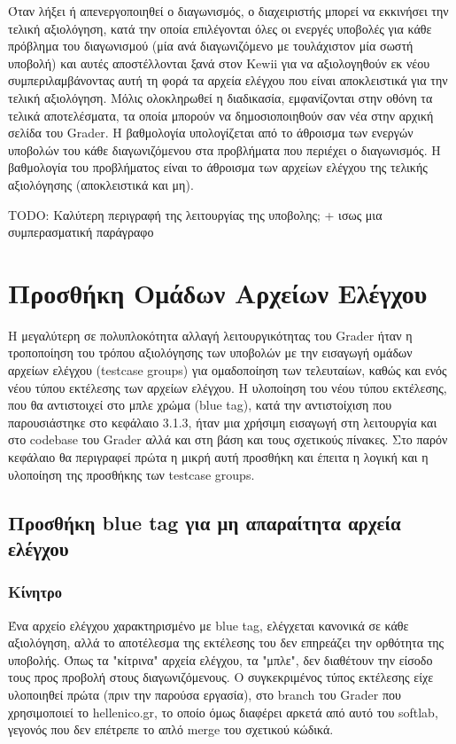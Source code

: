 \documentclass[diploma]{softlab-thesis}
\begin{document}
\bigskip

Όταν λήξει ή απενεργοποιηθεί ο διαγωνισμός, ο διαχειριστής μπορεί να εκκινήσει
την τελική αξιολόγηση, κατά την οποία επιλέγονται όλες οι ενεργές υποβολές για
κάθε πρόβλημα του διαγωνισμού (μία ανά διαγωνιζόμενο με τουλάχιστον μία σωστή
υποβολή) και αυτές αποστέλλονται ξανά στον Kewii για να αξιολογηθούν εκ νέου
συμπεριλαμβάνοντας αυτή τη φορά τα αρχεία ελέγχου που είναι αποκλειστικά για
την τελική αξιολόγηση. Μόλις ολοκληρωθεί η διαδικασία, εμφανίζονται στην οθόνη
τα τελικά αποτελέσματα, τα οποία μπορούν να δημοσιοποιηθούν σαν νέα στην αρχική
σελίδα του Grader. Η βαθμολογία υπολογίζεται από το άθροισμα των ενεργών
υποβολών του κάθε διαγωνιζόμενου στα προβλήματα που περιέχει ο διαγωνισμός. Η
βαθμολογία του προβλήματος είναι το άθροισμα των αρχείων ελέγχου της τελικής
αξιολόγησης (αποκλειστικά και μη).

TODO: Καλύτερη περιγραφή της λειτουργίας της υποβολης; + ισως μια συμπερασματική παράγραφο

\chapter{Προσθήκη Ομάδων Αρχείων Ελέγχου}

Η μεγαλύτερη σε πολυπλοκότητα αλλαγή λειτουργικότητας του Grader ήταν η
τροποποίηση του τρόπου αξιολόγησης των υποβολών με την εισαγωγή ομάδων αρχείων
ελέγχου (testcase groups) για ομαδοποίηση των τελευταίων, καθώς και ενός νέου
τύπου εκτέλεσης των αρχείων ελέγχου. Η υλοποίηση του νέου τύπου εκτέλεσης, που
θα αντιστοιχεί στο μπλε χρώμα (blue tag), κατά την αντιστοίχιση που
παρουσιάστηκε στο κεφάλαιο 3.1.3, ήταν μια χρήσιμη εισαγωγή στη
λειτουργία και στο codebase του Grader αλλά και στη βάση και τους σχετικούς
πίνακες. Στο παρόν κεφάλαιο θα περιγραφεί πρώτα η μικρή αυτή προσθήκη και
έπειτα η λογική και η υλοποίηση της προσθήκης των testcase groups.


\section{Προσθήκη blue tag για μη απαραίτητα αρχεία ελέγχου}

\subsection{Κίνητρο}

Ένα αρχείο ελέγχου χαρακτηρισμένο με blue tag, ελέγχεται κανονικά σε κάθε
αξιολόγηση, αλλά το αποτέλεσμα της εκτέλεσης του δεν επηρεάζει την ορθότητα της
υποβολής. Όπως τα "κίτρινα" αρχεία ελέγχου, τα "μπλε", δεν διαθέτουν την είσοδο
τους προς προβολή στους διαγωνιζόμενους. Ο συγκεκριμένος τύπος εκτέλεσης είχε
υλοποιηθεί πρώτα (πριν την παρούσα εργασία), στο branch του Grader που
χρησιμοποιεί το hellenico.gr, το οποίο όμως διαφέρει αρκετά από αυτό του softlab,
γεγονός που δεν επέτρεπε το απλό merge του σχετικού κώδικά.
\end{document}
